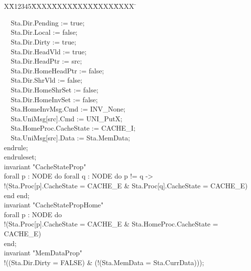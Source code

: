 \documentclass{llncs-new}
\newlength{\fminilength}
\newenvironment{fmini}[1][\linewidth]
  {\setlength{\fminilength}{#1\fboxsep-2\fboxrule}%
   \vspace{2ex}\noindent\begin{lrbox}{\fminibox}\begin{minipage}{\fminilength}%
   \mbox{ }\hfill\vspace{-2.5ex}}%
  {\end{minipage}\end{lrbox}\vspace{1ex}\hspace{0ex}%
   \framebox{\usebox{\fminibox}}}
\newenvironment{specification}
{\noindent\scriptsize
\tt\begin{fmini}\begin{tabbing}X\=X12345\=XXXX\=XXXX\=XXXX\=XXXX\=XXXX
\=\+\kill} {\end{tabbing}\normalfont\end{fmini}}
\def \twoSpaces {\ \ }
\def \twoSpaces {\ \ }
\begin{document}
\begin{specification}
\begin{minipage}[t]{0.5\linewidth}
\end{minipage}
\begin{minipage}[t]{0.5\linewidth}
\indent \twoSpaces  Sta.Dir.Pending := true;\\
\indent \twoSpaces  Sta.Dir.Local := false;\\
\indent \twoSpaces  Sta.Dir.Dirty := true;\\
\indent \twoSpaces  Sta.Dir.HeadVld := true;\\
\indent \twoSpaces  Sta.Dir.HeadPtr := src;\\
\indent \twoSpaces  Sta.Dir.HomeHeadPtr := false;\\
\indent \twoSpaces  Sta.Dir.ShrVld := false;\\
\indent \twoSpaces  Sta.Dir.HomeShrSet := false;\\
\indent \twoSpaces  Sta.Dir.HomeInvSet := false;\\
\indent \twoSpaces  Sta.HomeInvMsg.Cmd := INV\_None;\\

\indent \twoSpaces  Sta.UniMsg[src].Cmd := UNI\_PutX;\\

\indent \twoSpaces  Sta.HomeProc.CacheState := CACHE\_I;\\
\indent \twoSpaces  Sta.UniMsg[src].Data := Sta.MemData;\\
endrule;\\
endruleset;\\

invariant "CacheStateProp"\\
  forall p : NODE do forall q : NODE do     p != q ->\\
    !(Sta.Proc[p].CacheState = CACHE\_E \& Sta.Proc[q].CacheState = CACHE\_E)\\
  end end;\\

invariant "CacheStatePropHome"\\
  forall p : NODE do\\
    !(Sta.Proc[p].CacheState = CACHE\_E \& Sta.HomeProc.CacheState = CACHE\_E)\\
  end;\\

invariant "MemDataProp"\\
  !((Sta.Dir.Dirty = FALSE) \& (!(Sta.MemData = Sta.CurrData)));

\end{minipage}

\end{specification}
\end{document}

